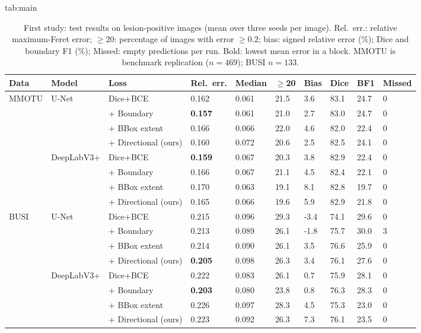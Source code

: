 \documentclass{midl}
\begin{document}
\begin{table}[htbp]
\floatconts
  {tab:main}
  {\caption{First study: test results on lesion-positive images (mean over three seeds per image). Rel.\ err.: relative maximum-Feret error; $\ge$20: percentage of images with error $\ge0.2$; bias: signed relative error (\%); Dice and boundary F1 (\%); Missed: empty predictions per run. Bold: lowest mean error in a block. MMOTU is benchmark replication ($n=469$); BUSI $n=133$.}}
  {\scriptsize\setlength{\tabcolsep}{3pt}\begin{tabular}{llllllllll}
  \toprule
  Data & Model & Loss & Rel.\ err. & Median & $\ge$20 & Bias & Dice & BF1 & Missed\\
  \midrule
  \multirow{8}{*}{MMOTU} & \multirow{4}{*}{U-Net} & Dice+BCE & 0.162 & 0.061 & 21.5 & 3.6 & 83.1 & 24.7 & 0 \\
 &  & + Boundary & \textbf{0.157} & 0.061 & 21.0 & 2.7 & 83.0 & 24.7 & 0 \\
 &  & + BBox extent & 0.166 & 0.066 & 22.0 & 4.6 & 82.0 & 22.4 & 0 \\
 &  & + Directional (ours) & 0.160 & 0.072 & 20.6 & 2.5 & 82.5 & 24.1 & 0 \\
\midrule
 & \multirow{4}{*}{DeepLabV3+} & Dice+BCE & \textbf{0.159} & 0.067 & 20.3 & 3.8 & 82.9 & 22.4 & 0 \\
 &  & + Boundary & 0.166 & 0.067 & 21.1 & 4.5 & 82.4 & 22.1 & 0 \\
 &  & + BBox extent & 0.170 & 0.063 & 19.1 & 8.1 & 82.8 & 19.7 & 0 \\
 &  & + Directional (ours) & 0.165 & 0.066 & 19.6 & 5.9 & 82.9 & 21.8 & 0 \\
\midrule
\multirow{8}{*}{BUSI} & \multirow{4}{*}{U-Net} & Dice+BCE & 0.215 & 0.096 & 29.3 & -3.4 & 74.1 & 29.6 & 0 \\
 &  & + Boundary & 0.213 & 0.089 & 26.1 & -1.8 & 75.7 & 30.0 & 3 \\
 &  & + BBox extent & 0.214 & 0.090 & 26.1 & 3.5 & 76.6 & 25.9 & 0 \\
 &  & + Directional (ours) & \textbf{0.205} & 0.098 & 26.3 & 3.4 & 76.1 & 27.6 & 0 \\
\midrule
 & \multirow{4}{*}{DeepLabV3+} & Dice+BCE & 0.222 & 0.083 & 26.1 & 0.7 & 75.9 & 28.1 & 0 \\
 &  & + Boundary & \textbf{0.203} & 0.080 & 23.8 & 0.8 & 76.3 & 28.3 & 0 \\
 &  & + BBox extent & 0.226 & 0.097 & 28.3 & 4.5 & 75.3 & 23.0 & 0 \\
 &  & + Directional (ours) & 0.223 & 0.092 & 26.3 & 7.3 & 76.1 & 23.5 & 0 \\
  \bottomrule
  \end{tabular}}
\end{table}
\end{document}
